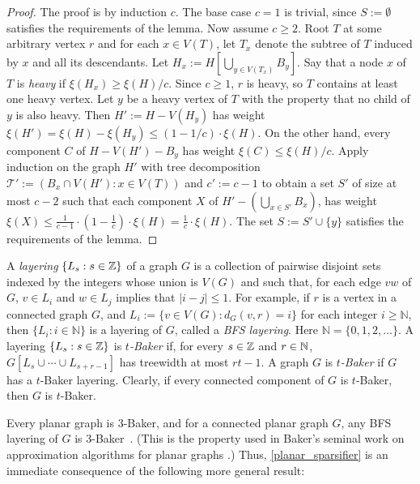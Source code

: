 \documentclass{patmorin}
\renewcommand{\ge}{\geqslant}
\renewcommand{\le}{\leqslant}
\renewcommand{\geq}{\geqslant}
\newcommand{\david}[1]{{\color{orange} David: #1}}
\newcommand{\pat}[1]{\textcolor{Blue}{Pat: #1}}
\newcommand{\defin}[1]{\emph{\textcolor{brightmaroon}{#1}}}
\newcommand{\NN}{\mathbb{N}}
\begin{document}
\begin{proof}
  The proof is by induction $c$.  The base case $c=1$ is trivial, since $S:=\emptyset$ satisfies the requirements of the lemma.  Now assume $c\ge 2$.  Root $T$ at some arbitrary vertex $r$ and for each $x\in V(T)$, let $T_x$ denote the subtree of $T$ induced by $x$ and all its descendants.  Let $H_x:=H[\bigcup_{y\in V(T_x)} B_y]$.  Say that a node $x$ of $T$ is \defin{heavy} if $\xi(H_x) \ge \xi(H)/c$. Since $c\ge 1$, $r$ is heavy, so $T$ contains at least one heavy vertex. Let $y$ be a heavy vertex of $T$ with the property that no child of $y$ is also heavy.  Then $H':=H-V(H_y)$ has weight $\xi(H') = \xi(H)-\xi(H_y) \le (1-1/c)\cdot\xi(H)$.  On the other hand, every component $C$ of $H-V(H')-B_y$ has weight $\xi(C) \le \xi(H)/c$.  Apply induction on the graph $H'$ with tree decomposition $\mathcal{T}':=(B_x\cap V(H'):x\in V(T))$ and $c':=c-1$ to obtain a set $S'$ of size at most $c-2$ such that each component $X$ of $H'-(\bigcup_{x\in S'} B_x)$, has weight $\xi(X) \le \tfrac{1}{c-1}\cdot(1-\tfrac{1}{c})\cdot\xi(H) = \tfrac{1}{c}\cdot \xi(H)$.  The set $S:=S'\cup\{y\}$ satisfies the requirements of the lemma.
\end{proof}


A \defin{layering} $\{L_s:s\in\mathbb{Z}\}$ of a graph $G$ is a collection of pairwise disjoint sets indexed by the integers whose union is $V(G)$ and such that, for each edge $vw$ of $G$, $v\in L_i$ and $w\in L_j$ implies that $|i-j|\le 1$.
For example, if $r$ is a vertex in a connected graph $G$, and $L_i:=\{v\in V(G):d_G(v,r)=i\}$ for each integer $i\geq \NN$, then $\{L_i:i\in\NN\}$ is a layering of $G$, called a \defin{BFS layering}. Here $\NN=\{0,1,2,\dots\}$. A layering $\{L_s:s\in\mathbb{Z}\}$ is \defin{$t$-Baker} if, for every $s\in\mathbb{Z}$ and $r\in\mathbb{N}$, $G[L_s\cup\cdots\cup L_{s+r-1}]$ has treewidth at most $rt-1$. A graph $G$ is \defin{$t$-Baker} if $G$ has a $t$-Baker layering.  Clearly, if every connected component of $G$ is $t$-Baker, then $G$ is $t$-Baker.

Every planar graph is $3$-Baker, and for a connected planar graph $G$, any BFS layering of $G$ is $3$-Baker~\cite{RS-III}. (This is the property used in Baker's seminal work on approximation algorithms for planar graphs \cite{baker:approximation}.) Thus, \cref{planar_sparsifier} is an immediate consequence of the following more general result:
\end{document}
